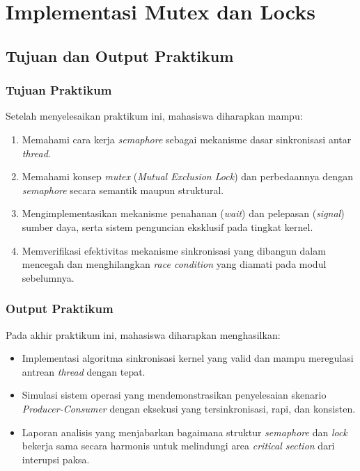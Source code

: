 
\chapter{Implementasi Mutex dan Locks}
\label{chap:modul-10}

\section{Tujuan dan Output Praktikum}

\subsection{Tujuan Praktikum}
Setelah menyelesaikan praktikum ini, mahasiswa diharapkan mampu:
\begin{enumerate}
	\item Memahami cara kerja \textit{semaphore} sebagai mekanisme dasar sinkronisasi antar \textit{thread}.
	\item Memahami konsep \textit{mutex} (\textit{Mutual Exclusion Lock}) dan perbedaannya dengan \textit{semaphore} secara semantik maupun struktural.
	\item Mengimplementasikan mekanisme penahanan (\textit{wait}) dan pelepasan (\textit{signal}) sumber daya, serta sistem penguncian eksklusif pada tingkat kernel.
	\item Memverifikasi efektivitas mekanisme sinkronisasi yang dibangun dalam mencegah dan menghilangkan \textit{race condition} yang diamati pada modul sebelumnya.
\end{enumerate}

\subsection{Output Praktikum}
Pada akhir praktikum ini, mahasiswa diharapkan menghasilkan:
\begin{itemize}
	\item Implementasi algoritma sinkronisasi kernel yang valid dan mampu meregulasi antrean \textit{thread} dengan tepat.
	\item Simulasi sistem operasi yang mendemonstrasikan penyelesaian skenario \textit{Producer-Consumer} dengan eksekusi yang tersinkronisasi, rapi, dan konsisten.
	\item Laporan analisis yang menjabarkan bagaimana struktur \textit{semaphore} dan \textit{lock} bekerja sama secara harmonis untuk melindungi area \textit{critical section} dari interupsi paksa.
\end{itemize}

